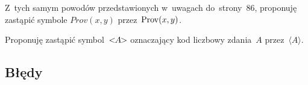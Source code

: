 \documentclass[a4paper,11pt]{article}
\numberwithin{equation}{section}
\begin{document}
\noindent
{} Z~tych samym powodów przedstawionych w~uwagach do~strony~86,
proponuję zastąpić symbole $Prov( x, y )$ przez~$\operatorname{Prov}( x, y )$.

\VerSpaceFour





\noindent
{} Proponuję zastąpić
symbol~$< \hspace{-0.35em} A \hspace{-0.35em} >$ oznaczający kod
liczbowy zdania~$A$ przez~$\langle A \rangle$.

\VerSpaceFour









































\subsection{Błędy}
\end{document}
